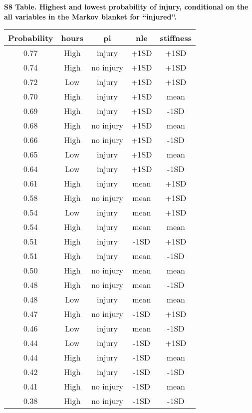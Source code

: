 \documentclass[
]{article}
\begin{document}
\newpage

\textbf{S8 Table. Highest and lowest probability of injury, conditional on the all variables in the Markov blanket for ``injured''.}

\begin{table}[H]
\centering
\begin{tabular}{c|c|c|c|c}
\hline
\textbf{Probability} & \textbf{hours} & \textbf{pi} & \textbf{nle} & \textbf{stiffness}\\
\hline
0.77 & High & injury & +1SD & +1SD\\
\hline
0.74 & High & no injury & +1SD & +1SD\\
\hline
0.72 & Low & injury & +1SD & +1SD\\
\hline
0.70 & High & injury & +1SD & mean\\
\hline
0.69 & High & injury & +1SD & -1SD\\
\hline
0.68 & High & no injury & +1SD & mean\\
\hline
0.66 & High & no injury & +1SD & -1SD\\
\hline
0.65 & Low & injury & +1SD & mean\\
\hline
0.64 & Low & injury & +1SD & -1SD\\
\hline
0.61 & High & injury & mean & +1SD\\
\hline
0.58 & High & no injury & mean & +1SD\\
\hline
0.54 & Low & injury & mean & +1SD\\
\hline
0.54 & High & injury & mean & mean\\
\hline
0.51 & High & injury & -1SD & +1SD\\
\hline
0.51 & High & injury & mean & -1SD\\
\hline
0.50 & High & no injury & mean & mean\\
\hline
0.48 & High & no injury & mean & -1SD\\
\hline
0.48 & Low & injury & mean & mean\\
\hline
0.47 & High & no injury & -1SD & +1SD\\
\hline
0.46 & Low & injury & mean & -1SD\\
\hline
0.44 & Low & injury & -1SD & +1SD\\
\hline
0.44 & High & injury & -1SD & mean\\
\hline
0.42 & High & injury & -1SD & -1SD\\
\hline
0.41 & High & no injury & -1SD & mean\\
\hline
0.38 & High & no injury & -1SD & -1SD\\

\end{tabular}
\end{table}
\end{document}

